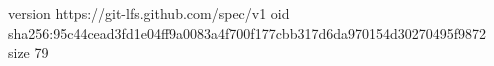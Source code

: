 version https://git-lfs.github.com/spec/v1
oid sha256:95c44cead3fd1e04ff9a0083a4f700f177cbb317d6da970154d30270495f9872
size 79
